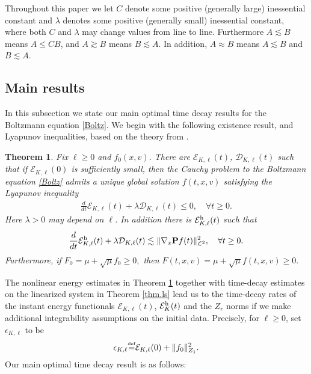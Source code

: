 \documentclass{amsart}
\newtheorem{theorem}{Theorem}[section]
\numberwithin{equation}{section}
\begin{document}
Throughout this paper  we let $C$  denote
some positive (generally large) inessential constant and ${\lambda}$ denotes some positive (generally small) inessential constant, where both $C$ and
${\lambda}$ may change values from line to line. 
Furthermore $A \lesssim B$ means $A \le C B$, and 
$A \gtrsim B$ means $B \lesssim A$.
In addition,
$A\approx B$ means $A \lesssim B$ and $B \lesssim A$.

\subsection{Main results}\label{sec:main}
In this subsection we state our main optimal time decay results for the Boltzmann equation \eqref{Boltz}.  We begin with the following existence result, and Lyapunov inequalities, based on the theory from \cite{gsNonCut0}.

\begin{theorem}\label{thm.energy}
Fix ${\ell} \ge 0$ and ${f}_0(x,{v})$.  
There are ${\mathcal{E}}_{{K},{\ell}}(t)$, ${\mathcal{D}}_{{K},{\ell}}(t)$ such that if ${\mathcal{E}}_{{K},{\ell}}(0)$ is
sufficiently small, then the Cauchy problem to
the Boltzmann equation \eqref{Boltz} admits a unique global solution
${f}(t,x,{v})$ satisfying the Lyapunov inequality
\begin{eqnarray}
\frac{d}{dt}{\mathcal{E}}_{{K},{\ell}}(t)+{\lambda} {\mathcal{D}}_{{K},{\ell}}(t)\leq 0,
\quad \forall t\geq 0.
\label{thm.energy.1}
\end{eqnarray}
Here ${\lambda} >0$ may depend on ${\ell}$.  In addition there is ${\mathcal{E}}_{{K},{\ell}}^{\rm h}(t)$
such that  
\begin{equation}\label{thm.energy.2}
\frac{d}{dt}{\mathcal{E}}_{{K},{\ell}}^{\rm h}(t)+{\lambda} {\mathcal{D}}_{{K},{\ell}}(t)
\lesssim
 \|{\nabla}_x{\mathbf{P}} {f}(t)\|_{{\mathcal{L}}^2}^2,
\quad \forall t\geq 0.
\end{equation}
Furthermore, if
$
 F_{0}
 
 ={\mu}+{\sqrt{\mu}}{f}_{0}
 \geq 0,
$
then
$
F(t,x,{v})
={\mu}+{\sqrt{\mu}}{f}
(t,x,{v})
\geq 0.
$
\end{theorem}

The nonlinear energy estimates in Theorem \ref{thm.energy} together with time-decay estimates on the linearized
 system in Theorem \ref{thm.ls} lead us to the time-decay rates of
the instant energy functionals ${\mathcal{E}}_{{K},{\ell}}(t)$,
${\mathcal{E}}_{K}^{\rm h}(t)$ and the $Z_r$ norms  if we make additional integrability assumptions on the initial data. Precisely, for ${\ell}\ge0$, set ${\epsilon}_{{K},{\ell}}$ 
to be
\begin{equation}\label{def.id.jm}
    {\epsilon}_{{K},{\ell}}{\overset{\mbox{\tiny{def}}}{=}}{\mathcal{E}}_{{K},{\ell}}(0)+\|{f}_0\|_{Z_1}^2.
\end{equation}
Our main optimal time decay result is as follows:  
\end{document}
